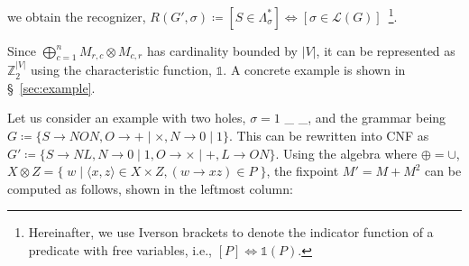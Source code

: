 \documentclass[sigplan,review,anonymous,acmsmall]{acmart}\settopmatter{printfolios=false,printccs=false,printacmref=false}
\begin{document}
  \noindent we obtain the recognizer, $R(G', \sigma) \coloneqq [S \in \Lambda^*_\sigma] \Leftrightarrow [\sigma \in \mathcal{L}(G)]$~\footnote{Hereinafter, we use Iverson brackets to denote the indicator function of a predicate with free variables, i.e., $[P] \Leftrightarrow \mathds{1}(P)$.}.

  Since $\bigoplus_{c = 1}^n M_{r,c} \otimes M_{c,r}$ has cardinality bounded by $|V|$, it can be represented as $\mathbb{Z}_2^{|V|}$ using the characteristic function, $\mathds{1}$. A concrete example is shown in \S~\ref{sec:example}.

  Let us consider an example with two holes, $\sigma = 1$ \_ \_, and the grammar being $G\coloneqq\{S\rightarrow N O N, O \rightarrow + \mid \times, N \rightarrow 0 \mid 1\}$. This can be rewritten into CNF as $G'\coloneqq \{S \rightarrow N L, N \rightarrow 0 \mid 1, O \rightarrow × \mid +, L \rightarrow O N\}$. Using the algebra where $\oplus=\cup$, $X \otimes Z = \big\{\;w \mid \langle x, z\rangle \in X \times Z, (w\rightarrow xz) \in P\;\big\}$, the fixpoint $M' = M + M^2$ can be computed as follows, shown in the leftmost column:\\
\end{document}
